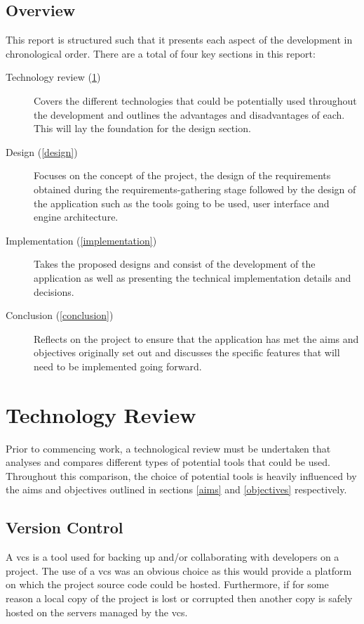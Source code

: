 \documentclass[11pt]{article}
\begin{document}
\subsection{Overview}
This report is structured such that it presents each aspect of the development
in chronological order. There are a total of four key sections in this report:
\begin{description}
  \item[Technology review (\ref{technology_review})] Covers the different
    technologies that could be potentially used throughout the development and
    outlines the advantages and disadvantages of each. This will lay the
    foundation for the design section.
  \item[Design (\ref{design})] Focuses on the concept of the project, the design
    of the requirements obtained during the requirements-gathering stage
    followed by the design of the application such as the tools going to be
    used, user interface and engine architecture.
  \item[Implementation (\ref{implementation})] Takes the proposed designs and
    consist of the development of the application as well as presenting the
    technical implementation details and decisions.
  \item[Conclusion (\ref{conclusion})] Reflects on the project to ensure that
    the application has met the aims and objectives originally set out and
    discusses the specific features that will need to be implemented going
    forward.
\end{description}

\clearpage
\section{Technology Review} \label{technology_review}
Prior to commencing work, a technological review must be undertaken that
analyses and compares different types of potential tools that could be used.
Throughout this comparison, the choice of potential tools is heavily influenced
by the aims and objectives outlined in sections \ref{aims} and \ref{objectives}
respectively.


\subsection{Version Control}
A \gls*{vcs} is a tool used for backing up and/or collaborating with developers
on a project. The use of a \gls*{vcs} was an obvious choice as this would
provide a platform on which the project source code could be hosted.
Furthermore, if for some reason a local copy of the project is lost or corrupted
then another copy is safely hosted on the servers managed by the \gls*{vcs}.
\end{document}
